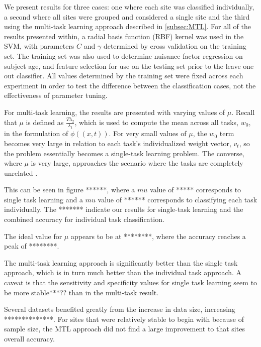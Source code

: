 \documentclass{llncs}
\begin{document}
We present results for three cases: one where each site was classified individually, a second where all sites were grouped and considered a single site and the third using the multi-task learning approach described in \ref{subsec:MTL}. For all of the results presented within, a radial basis function (RBF) kernel was used in the SVM, with parameters $C$ and $\gamma$ determined by cross validation on the training set.   The training set was also used to determine nuisance factor regression on subject age, and feature selection for use on the testing set prior to the leave one out classifier.  All values determined by the training set were fixed across each experiment in order to test the difference between the classification cases, not the effectiveness of parameter tuning.

For multi-task learning, the results are presented with varying values of $\mu$.  Recall that $\mu$ is defined as $\frac{T\lambda_2}{\lambda_1}$, which is used to compute the mean across all tasks, $w_0$, in the formulation of $\phi((x,t))$. For very small values of $\mu$, the $w_0$ term becomes very large in relation to each task's individualized weight vector, $v_t$, so the problem essentially becomes a single-task learning problem.  The converse, where $\mu$ is very large, approaches the scenario where the tasks are completely unrelated \cite{regMTL}. 

This can be seen in figure ******, where a $mu$ value of ***** corresponds to single task learning and a $mu$ value of ****** corresponds to classifying each task individually.  The ******* indicate our results for single-task learning and the combined accuracy for individual task classification.

The ideal value for $\mu$ appears to be at ********, where the accuracy reaches a peak of ********.

The multi-task learning approach is significantly better than the single task approach, which is in turn much better than the individual task approach. A caveat is that the sensitivity and specificity values for single task learning seem to be more stable***?? than in the multi-task result. 


Several datasets benefited greatly from the increase in data size, increasing **************.  For sites that were relatively stable to begin with because of sample size, the MTL approach did not find a large improvement to that sites overall accuracy.
 
\end{document}
